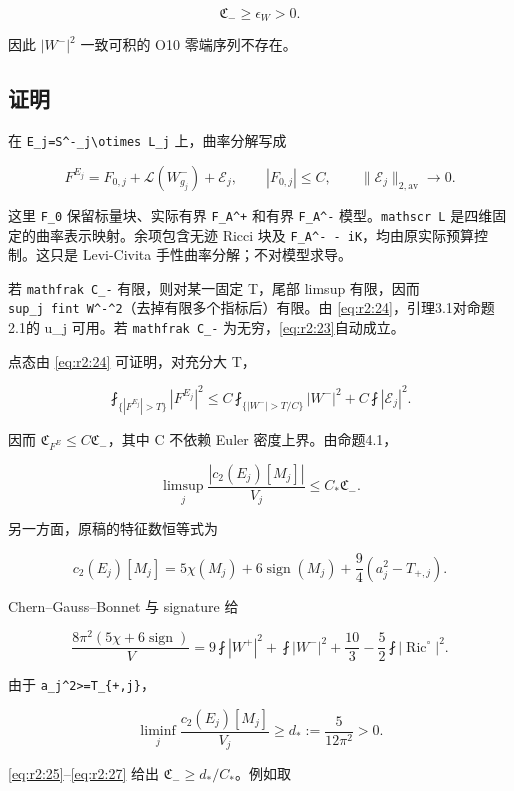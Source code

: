 \documentclass[UTF8,11pt,openany,oneside,fontset=none]{ctexbook}
\begin{document}
\[
 \boxed{\mathfrak C_-\ge\epsilon_W>0.}
 \tag{2.23}\label{eq:r2:23}
\]

因此 \(|W^-|^2\) 一致可积的 O10 零端序列不存在。

\subsection{证明}\label{ch2:ux8bc1ux660e-3}

在 \texttt{E\_j=S\^{}-\_j\textbackslash{}otimes\ L\_j} 上，曲率分解写成

\[
 F^{E_j}=F_{0,j}+\mathscr L(W^-_{g_j})+\mathcal E_j,
 \qquad |F_{0,j}|\le C,
 \qquad\|\mathcal E_j\|_{2,\mathrm{av}}\to0.
 \tag{2.24}\label{eq:r2:24}
\]

这里 \texttt{F\_0} 保留标量块、实际有界 \texttt{F\_A\^{}+} 和有界 \texttt{F\_A\^{}-} 模型。\texttt{mathscr\ L} 是四维固定的曲率表示映射。余项包含无迹 Ricci 块及 \texttt{F\_A\^{}-\ -\ iK}，均由原实际预算控制。这只是 Levi-Civita 手性曲率分解；不对模型求导。

若 \texttt{mathfrak\ C\_-} 有限，则对某一固定 T，尾部 limsup 有限，因而 \texttt{sup\_j\ fint\ \textbar{}W\^{}-\textbar{}\^{}2}（去掉有限多个指标后）有限。由 \eqref{eq:r2:24}，引理3.1对命题2.1的 u\_j 可用。若 \texttt{mathfrak\ C\_-} 为无穷，\eqref{eq:r2:23}自动成立。

点态由 \eqref{eq:r2:24} 可证明，对充分大 T，

\[
 \fint_{\{|F^{E_j}|>T\}}|F^{E_j}|^2
 \le C\fint_{\{|W^-|>T/C\}}|W^-|^2
       +C\fint|\mathcal E_j|^2.
\]

因而 \(\mathfrak C_{F^E}\le C\mathfrak C_-\)，其中 C 不依赖 Euler 密度上界。由命题4.1，

\[
 \limsup_j\frac{|c_2(E_j)[M_j]|}{V_j}
 \le C_*\mathfrak C_-.
 \tag{2.25}\label{eq:r2:25}
\]

另一方面，原稿的特征数恒等式为

\[
 c_2(E_j)[M_j]
 =5\chi(M_j)+6\operatorname{sign}(M_j)
 +\frac94(a_j^2-T_{+,j}).
 \tag{2.26}\label{eq:r2:26}
\]

Chern--Gauss--Bonnet 与 signature 给

\[
 \frac{8\pi^2(5\chi+6\operatorname{sign})}{V}
 =9\fint|W^+|^2+\fint|W^-|^2
       +\frac{10}{3}-\frac52\fint|\operatorname{Ric}^\circ|^2.
\]

由于 \texttt{a\_j\^{}2\textgreater{}=T\_\{+,j\}}，

\[
 \liminf_j\frac{c_2(E_j)[M_j]}{V_j}
 \ge d_*:=\frac{5}{12\pi^2}>0.
 \tag{2.27}\label{eq:r2:27}
\]

\eqref{eq:r2:25}--\eqref{eq:r2:27} 给出 \(\mathfrak C_-\ge d_*/C_*\)。例如取
\end{document}

